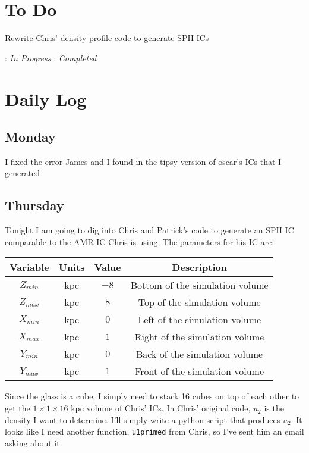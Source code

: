 \documentclass[11pt,letterpaper]{article}
\begin{document}
\section{To Do}
\begin{bullets}
\item Rewrite Chris' density profile code to generate SPH ICs
\end{bullets}

\textleaf : \textit{In Progress} \qquad \checkmark : \textit{Completed}
\section{Daily Log}

\subsection{Monday}

I fixed the error James and I found in the tipsy version of oscar's ICs
that I generated

\subsection{Thursday}

Tonight I am going to dig into Chris and Patrick's code to generate an
SPH IC comparable to the AMR IC Chris is using. The parameters for his
IC are:

\center

\begin{tabular}{| c | c | c | c |}
\hline
Variable & Units & Value & Description\\
\hline
$Z_{min}$ & kpc & $-8$ & Bottom of the simulation volume\\
$Z_{max}$ & kpc & $8$ & Top of the simulation volume\\
$X_{min}$ & kpc & $0$ & Left of the simulation volume\\
$X_{max}$ & kpc & $1$ & Right of the simulation volume\\
$Y_{min}$ & kpc & $0$ & Back of the simulation volume\\
$Y_{max}$ & kpc & $1$ & Front of the simulation volume\\
\hline
\end{tabular}

Since the glass is a cube, I simply need to stack 16 cubes on top of
each other to get the $1\times1\times16$ kpc volume of Chris' ICs. In
Chris' original code, $u_2$ is the density I want to determine. I'll
simply write a python script that produces $u_2$. It looks like I need
another function, \texttt{u1primed} from Chris, so I've sent him an
email asking about it.
\end{document}
